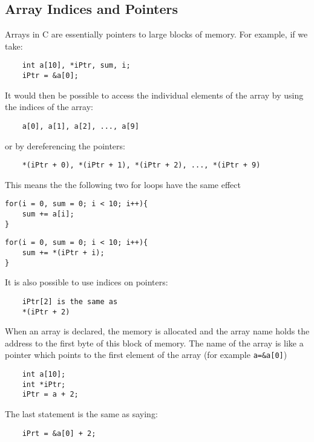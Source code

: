 \subsection{Array Indices and Pointers}
Arrays in C are essentially pointers to large blocks of memory. For example, if we take:
\begin{verbatim}
    int a[10], *iPtr, sum, i;
    iPtr = &a[0];
\end{verbatim}
It would then be possible to access the individual elements of the array by using the indices of the array:
\begin{verbatim}
    a[0], a[1], a[2], ..., a[9]
\end{verbatim}
or by dereferencing the pointers:
\begin{verbatim}
    *(iPtr + 0), *(iPtr + 1), *(iPtr + 2), ..., *(iPtr + 9) 
\end{verbatim}
This means the the following two for loops have the same effect\\

\begin{minipage}{0.45\textwidth}
\begin{verbatim}
for(i = 0, sum = 0; i < 10; i++){
    sum += a[i];
}
\end{verbatim}
\end{minipage}\hfill
\begin{minipage}{0.45\textwidth}
\begin{verbatim}
for(i = 0, sum = 0; i < 10; i++){
    sum += *(iPtr + i);
}
\end{verbatim}
\end{minipage}
\vspace{1em}

It is also possible to use indices on pointers:
\begin{verbatim}
    iPtr[2] is the same as
    *(iPtr + 2)
\end{verbatim}

When an array is declared, the memory is allocated and the array name holds the address to the first byte of this block of memory. The name of the array is like a pointer which points to the first element of the array (for example \verb|a=&a[0]|)
\begin{verbatim}
    int a[10];
    int *iPtr;
    iPtr = a + 2;
\end{verbatim}
The last statement is the same as saying:
\begin{verbatim}
    iPrt = &a[0] + 2;
\end{verbatim}

